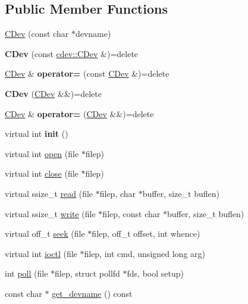 \subsection*{Public Member Functions}
\begin{DoxyCompactItemize}
\item 
\hyperlink{classcdev_1_1CDev_acd46bce7814f428044c0258f8d0518ab}{C\+Dev} (const char $\ast$devname)
\item 
\mbox{\label{classcdev_1_1CDev_a23663da9547f16eaa68ee0adf568bd12}} 
{\bfseries C\+Dev} (const \hyperlink{classcdev_1_1CDev}{cdev\+::\+C\+Dev} \&)=delete
\item 
\mbox{\label{classcdev_1_1CDev_acd0afe1a56175f89627126c57f382a20}} 
\hyperlink{classcdev_1_1CDev}{C\+Dev} \& {\bfseries operator=} (const \hyperlink{classcdev_1_1CDev}{C\+Dev} \&)=delete
\item 
\mbox{\label{classcdev_1_1CDev_a37de4c22663367cb98ee75a66479c961}} 
{\bfseries C\+Dev} (\hyperlink{classcdev_1_1CDev}{C\+Dev} \&\&)=delete
\item 
\mbox{\label{classcdev_1_1CDev_aa59b53a58372869bbe2f163bef0d5b74}} 
\hyperlink{classcdev_1_1CDev}{C\+Dev} \& {\bfseries operator=} (\hyperlink{classcdev_1_1CDev}{C\+Dev} \&\&)=delete
\item 
\mbox{\label{classcdev_1_1CDev_a09c11095ecdc3b1bfe7eb0e7d47ea954}} 
virtual int {\bfseries init} ()
\item 
virtual int \hyperlink{classcdev_1_1CDev_ac04b7ee91373c86545107e3467ba54c1}{open} (file $\ast$filep)
\item 
virtual int \hyperlink{classcdev_1_1CDev_a9241755ab3abf102eea85dad1e3dc6c4}{close} (file $\ast$filep)
\item 
virtual ssize\+\_\+t \hyperlink{classcdev_1_1CDev_a1b0db49c478b621333aff6bb3321d057}{read} (file $\ast$filep, char $\ast$buffer, size\+\_\+t buflen)
\item 
virtual ssize\+\_\+t \hyperlink{classcdev_1_1CDev_a54aff43049b22cea19f8cc31cb2a0fd0}{write} (file $\ast$filep, const char $\ast$buffer, size\+\_\+t buflen)
\item 
virtual off\+\_\+t \hyperlink{classcdev_1_1CDev_a987dd32ef79c2bb4380fa021ce430de2}{seek} (file $\ast$filep, off\+\_\+t offset, int whence)
\item 
virtual int \hyperlink{classcdev_1_1CDev_a87eb4d4b92a501de458736e8d24eec40}{ioctl} (file $\ast$filep, int cmd, unsigned long arg)
\item 
int \hyperlink{classcdev_1_1CDev_a219a565bb1842c62e0f45a7eeaaec0d3}{poll} (file $\ast$filep, struct pollfd $\ast$fds, bool setup)
\item 
const char $\ast$ \hyperlink{classcdev_1_1CDev_a0bc1072e967a90dfac04a1227f200f6f}{get\+\_\+devname} () const
\end{DoxyCompactItemize}
